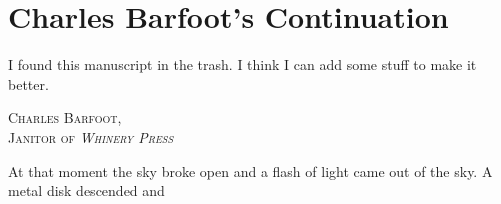 \chapter{Charles Barfoot's Continuation}
I found this manuscript in the trash. I think I can add some stuff to make it better.
\begin{flushright}
\textsc{
Charles Barfoot,\\
Janitor of \emph{Whinery Press}}
\end{flushright}

At that moment the sky broke open and a flash of light came out of the sky. A metal disk descended and
